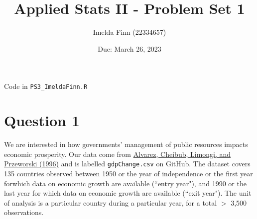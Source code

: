 \documentclass[12pt,letterpaper]{article}
\title{Applied Stats II - Problem Set 1}
\date{Due: March 26, 2023}
\author{Imelda Finn (22334657)}
\begin{document}
	\maketitle

	Code in \texttt{PS3\_ImeldaFinn.R}

\section*{Question 1}
\vspace{.25cm}
\noindent We are interested in how governments' management of public resources impacts economic prosperity. Our data come from \href{https://www.researchgate.net/profile/Adam_Przeworski/publication/240357392_Classifying_Political_Regimes/links/0deec532194849aefa000000/Classifying-Political-Regimes.pdf}{Alvarez, Cheibub, Limongi, and Przeworski (1996)} and is labelled \texttt{gdpChange.csv} on GitHub. The dataset covers 135 countries observed between 1950 or the year of independence or the first year forwhich data on economic growth are available (``entry year"), and 1990 or the last year for which data on economic growth are available (``exit year"). The unit of analysis is a particular country during a particular year, for a total $>$ 3,500 observations. 
\end{document}
